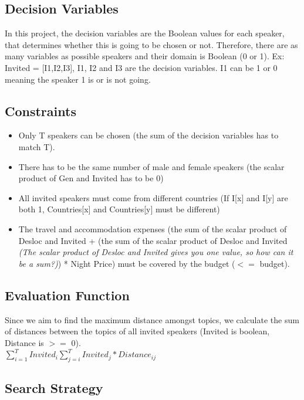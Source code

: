 \documentclass[runningheads,a4paper]{llncs}
\begin{document}
\subsection{Decision Variables}

In this project, the decision variables are the Boolean values for each speaker, that determines whether this is going to be chosen or not. Therefore, there are as many variables as possible speakers and their domain is Boolean (0 or 1). Ex: Invited = [I1,I2,I3], I1, I2 and I3 are the decision variables. I1 can be 1 or 0 meaning the speaker 1 is or is not going.

\subsection{Constraints}

\begin{itemize}
\item Only T speakers can be chosen (the sum of the decision variables has to match T).
\item There has to be the same number of male and female speakers (the scalar product of Gen and Invited has to be 0)
\item All invited speakers must come from different countries (If I[x] and I[y] are both 1, Countries[x] and Countries[y] must be different)
\item The travel and accommodation expenses (the sum of the scalar product of Desloc and Invited + (the sum of the scalar product of Desloc and Invited \textit{(The scalar product of Desloc and Invited gives you one value, so how can it be a sum?)}) * Night Price) must be covered by the budget ($<=$ budget).
\end{itemize}

\subsection{Evaluation Function}

Since we aim to find the maximum distance amongst topics, we calculate the sum of distances between the topics of all invited speakers (Invited is boolean, Distance is $>=$ 0).\\

$\sum_{i=1}^{T} Invited_i{ \sum_{j=i}^{T} Invited_j * Distance_{ij} }$ 

\subsection{Search Strategy}
\end{document}
